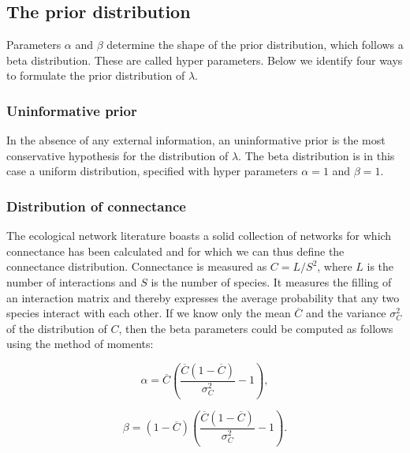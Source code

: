 \documentclass[12pt]{article}
\begin{document}
\begin{spacing}{2.0}
    \subsection*{The prior distribution}    

      Parameters $\alpha$ and $\beta$ determine the shape of the prior distribution, which follows a beta distribution. These are called hyper parameters. Below we identify four ways to formulate the prior distribution of $\lambda$. 

      \subsubsection*{Uninformative prior}
        
          In the absence of any external information, an uninformative prior is the most conservative hypothesis for the distribution of $\lambda$. The beta distribution is in this case a uniform distribution, specified with hyper parameters $\alpha=1$ and $\beta=1$. 

      \subsubsection*{Distribution of connectance}
        
          The ecological network literature boasts a solid collection of networks for which connectance has been calculated and for which we can thus define the connectance distribution. Connectance is measured as $C = L/S^2$, where $L$ is the number of interactions and $S$ is the number of species. It measures the filling of an interaction matrix and thereby expresses the average probability that any two species interact with each other. If we know only the mean $\overline{C}$ and the variance $\sigma_C^2$ of the distribution of $C$,
          then the beta parameters could be computed as follows using the method of moments:

          \begin{equation}
          \alpha = \overline{C}(\frac{\overline{C}(1-\overline{C})}{\sigma_C^2}-1) ,
          \end{equation}

          \begin{equation}
          \beta = (1-\overline{C})(\frac{\overline{C}(1-\overline{C})}{\sigma_C^2}-1) .
          \end{equation}
    

\end{spacing}
\end{document}
